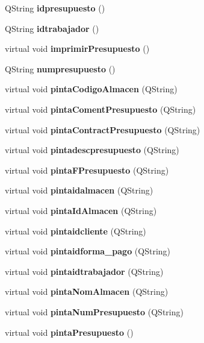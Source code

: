 \begin{CompactItemize}
\item 
QString {\bf idpresupuesto} ()\label{classpresupuesto_a15}

\item 
QString {\bf idtrabajador} ()\label{classpresupuesto_a16}

\item 
virtual void {\bf imprimir\-Presupuesto} ()
\item 
QString {\bf numpresupuesto} ()\label{classpresupuesto_a18}

\item 
virtual void {\bf pinta\-Codigo\-Almacen} (QString)\label{classpresupuesto_a19}

\item 
virtual void {\bf pinta\-Coment\-Presupuesto} (QString)\label{classpresupuesto_a20}

\item 
virtual void {\bf pinta\-Contract\-Presupuesto} (QString)\label{classpresupuesto_a21}

\item 
virtual void {\bf pintadescpresupuesto} (QString)\label{classpresupuesto_a22}

\item 
virtual void {\bf pinta\-FPresupuesto} (QString)\label{classpresupuesto_a23}

\item 
virtual void {\bf pintaidalmacen} (QString)\label{classpresupuesto_a24}

\item 
virtual void {\bf pinta\-Id\-Almacen} (QString)\label{classpresupuesto_a25}

\item 
virtual void {\bf pintaidcliente} (QString)\label{classpresupuesto_a26}

\item 
virtual void {\bf pintaidforma\_\-pago} (QString)\label{classpresupuesto_a27}

\item 
virtual void {\bf pintaidtrabajador} (QString)\label{classpresupuesto_a28}

\item 
virtual void {\bf pinta\-Nom\-Almacen} (QString)\label{classpresupuesto_a29}

\item 
virtual void {\bf pinta\-Num\-Presupuesto} (QString)\label{classpresupuesto_a30}

\item 
virtual void {\bf pinta\-Presupuesto} ()\label{classpresupuesto_a31}


\end{CompactItemize}
